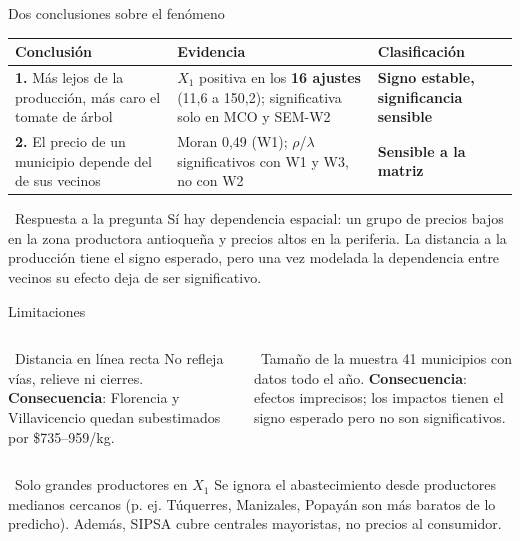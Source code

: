 \documentclass[aspectratio=169,11pt]{beamer}
\begin{document}
\begin{frame}{Dos conclusiones sobre el fenómeno}
  \centering\small
  \begin{tabular}{>{\raggedright\arraybackslash}p{3.9cm} >{\raggedright\arraybackslash}p{5.3cm} >{\raggedright\arraybackslash}p{3.4cm}}
    \toprule
    Conclusión & Evidencia & Clasificación \\
    \midrule
    \textbf{1.} Más lejos de la producción, más caro el tomate de árbol
      & $X_1$ positiva en los \textbf{16 ajustes} (11,6 a 150,2); significativa solo en MCO y SEM-W2
      & \textcolor{naranja}{\textbf{Signo estable, significancia sensible}} \\[4pt]
    \textbf{2.} El precio de un municipio depende del de sus vecinos
      & Moran 0,49 (W1); $\rho$/$\lambda$ significativos con W1 y W3, no con W2
      & \textcolor{naranja}{\textbf{Sensible a la matriz}} \\
    \bottomrule
  \end{tabular}

  \vspace{0.35cm}
  \begin{alertblock}{\faReply\ Respuesta a la pregunta}\small
    Sí hay dependencia espacial: un grupo de precios bajos en la zona productora antioqueña y
    precios altos en la periferia. La distancia a la producción tiene el signo esperado, pero
    una vez modelada la dependencia entre vecinos su efecto deja de ser significativo.
  \end{alertblock}
\end{frame}

\begin{frame}{Limitaciones}
  \begin{columns}[T]
    \begin{block}{\faRoute\ Distancia en línea recta}\small
      No refleja vías, relieve ni cierres. \textbf{Consecuencia}: Florencia y Villavicencio
      quedan subestimados por \$735--959/kg.
    \end{block}
    \begin{block}{\faUsers\ Tamaño de la muestra}\small
      41 municipios con datos todo el año. \textbf{Consecuencia}: efectos imprecisos; los
      impactos tienen el signo esperado pero no son significativos.
    \end{block}
  \end{columns}
  \vspace{0.2cm}
  \begin{block}{\faSeedling\ Solo grandes productores en $X_1$}\small
    Se ignora el abastecimiento desde productores medianos cercanos (p. ej. Túquerres,
    Manizales, Popayán son más baratos de lo predicho). Además, SIPSA cubre centrales
    mayoristas, no precios al consumidor.
  \end{block}
\end{frame}
\end{document}
